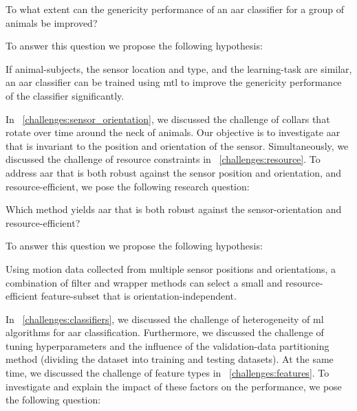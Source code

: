\begin{ResearchQuestion}
\label{rq:generic}
    To what extent can the genericity performance of an \gls{aar} classifier for a group of animals be improved?
    
\end{ResearchQuestion}

To answer this question we propose the following hypothesis:

\begin{hypothesis}
\label{hyp:generic}
    If animal-subjects, the sensor location and type, and the learning-task are similar, an \gls{aar} classifier can be trained using \gls{mtl} to improve the genericity performance of the classifier significantly.
\end{hypothesis}


In \sectionname~\ref{challenges:sensor_orientation}, we discussed the challenge of collars that rotate over time around the neck of animals.
Our objective is to investigate \gls{aar} that is invariant to the position and orientation of the sensor.
Simultaneously, we discussed the challenge of resource constraints in \sectionname~\ref{challenges:resource}.
To address \gls{aar} that is both robust against the sensor position and orientation, and resource-efficient, we pose the following research question:

 \begin{ResearchQuestion}
\label{rq:orientation}
     Which method yields \gls{aar} that is both robust against the sensor-orientation and resource-efficient?
\end{ResearchQuestion}

To answer this question we propose the following hypothesis:

\begin{hypothesis}
\label{hyp:orientation}
    Using motion data collected from multiple sensor positions and orientations, a combination of filter and wrapper methods can select a small and resource-efficient feature-subset that is orientation-independent.
\end{hypothesis}

In \sectionname~\ref{challenges:classifiers}, we discussed the challenge of heterogeneity of \gls{ml} algorithms for \gls{aar} classification.
Furthermore, we discussed the challenge of tuning hyperparameters and the influence of the validation-data partitioning method (dividing the dataset into training and testing datasets).
At the same time, we discussed the challenge of feature types in \sectionname~\ref{challenges:features}.
To investigate and explain the impact of these factors on the performance, we pose the following question:

